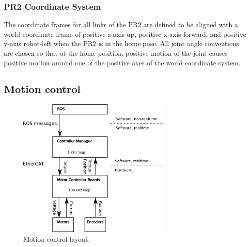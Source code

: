 \subsubsection{PR2 Coordinate System}
\label{sec:pr2_coordinate_system}
The coordinate frames for all links of the PR2 are defined to be aligned with
 a world coordinate frame of positive z-axis up, positive x-axis forward, and
positive y-axis robot-left when the PR2 is in the home pose.  All joint angle conventions
are chosen so that at the home position, positive motion of the joint causes positive
motion around one of the positive axes of the world coordinate system.

\subsection{Motion control}

\begin{figure}[h!]
\centering
\includegraphics[width=290px]{images/mechanism_control.png}
\caption{Motion control layout.}
\label{fig:motion_control}
\end{figure}


